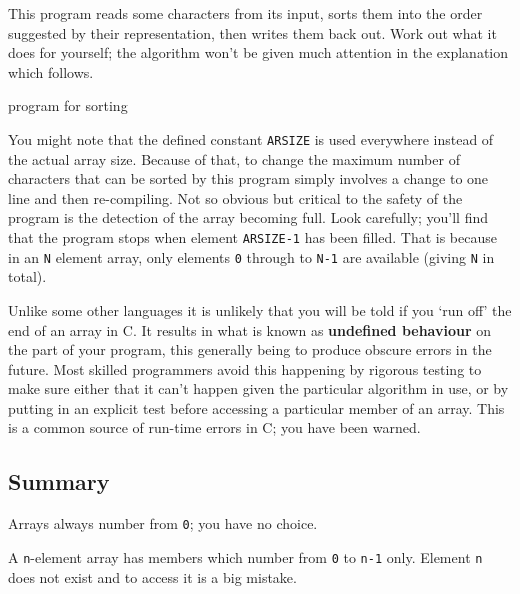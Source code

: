     This program reads some characters from its input, sorts them into the
    order suggested by their representation, then writes them back out. Work
    out what it does for yourself; the algorithm won't be given much attention
    in the explanation which follows.


    \begin{program}[phtb]
      \caption{\label{prg:readSort}program for sorting}
    \end{program}
  
   You might note that the defined constant \texttt{ARSIZE} is used
    everywhere instead of the actual array size. Because of that, to change
    the maximum number of characters that can be sorted by this program simply
    involves a change to one line and then re-compiling. Not so obvious but
    critical to the safety of the program is the detection of the array
    becoming full. Look carefully; you'll find that the program stops when
    element \texttt{ARSIZE-1} has been filled. That is because in an
    \texttt{N} element array, only elements \texttt{0} through to
    \texttt{N-1} are available (giving \texttt{N} in total).


   Unlike some other languages it is unlikely that you will be told if you
    `run off' the end of an array in C. It results in what is known as
    \textbf{undefined behaviour} on the part of your program, this generally
    being to produce obscure errors in the future. Most skilled programmers
    avoid this happening by rigorous testing to make sure either that it can't
    happen given the particular algorithm in use, or by putting in an explicit
    test before accessing a particular member of an array. This is a common
    source of run-time errors in C; you have been warned.


  

  \subsection{Summary}
   Arrays always number from \texttt{0}; you have no choice.

   A \texttt{n}-element array has members which number from
    \texttt{0} to \texttt{n-1} only.  Element \texttt{n} does not
    exist and to access it is a big mistake.

  


